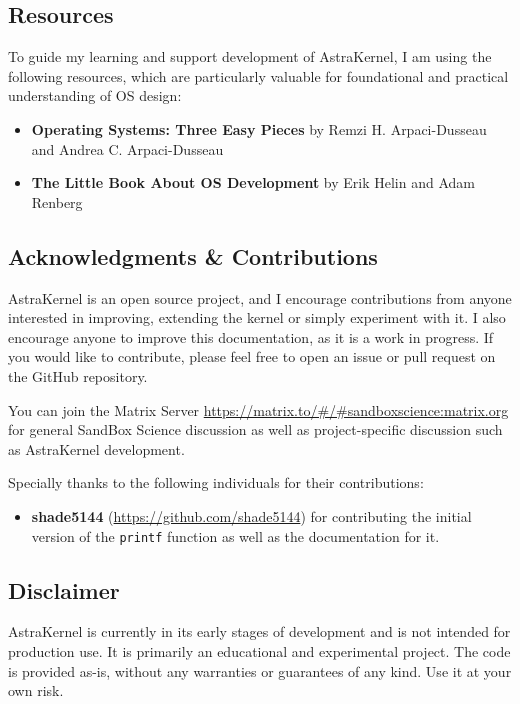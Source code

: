 \subsection*{Resources}

To guide my learning and support development of AstraKernel, I am using the following resources, 
which are particularly valuable for foundational and practical understanding of OS design:
\begin{itemize}
  \item \textbf{Operating Systems: Three Easy Pieces} by Remzi H. Arpaci-Dusseau and Andrea C. Arpaci-Dusseau
  \item \textbf{The Little Book About OS Development} by Erik Helin and Adam Renberg
\end{itemize}

\subsection*{Acknowledgments \& Contributions}

AstraKernel is an open source project, and I encourage contributions from anyone 
interested in improving, extending the kernel or simply experiment with it. I also 
encourage anyone to improve this documentation, as it is a work in progress.
If you would like to contribute, please feel free to open an issue or pull request on the GitHub repository.
\begin{info}
  You can join the Matrix Server \url{https://matrix.to/#/#sandboxscience:matrix.org} 
  for general SandBox Science discussion as well as project-specific discussion such 
  as AstraKernel development.
\end{info}

\noindent
Specially thanks to the following individuals for their contributions:
\begin{itemize}
  \item \textbf{shade5144} (\url{https://github.com/shade5144}) for contributing the initial version of the \texttt{printf} 
  function as well as the documentation for it.
\end{itemize}

\subsection*{Disclaimer}

AstraKernel is currently in its early stages of development and is not intended for production use. 
It is primarily an educational and experimental project. The code is provided as-is, 
without any warranties or guarantees of any kind. Use it at your own risk.
